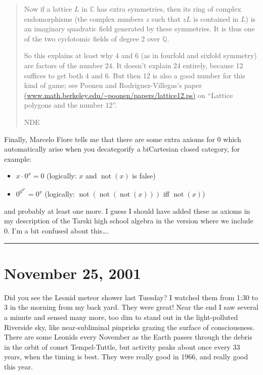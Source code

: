 \documentclass{article}
\def\tightlist{}
\begin{document}
\begin{quote}
Now if a lattice \(L\) in \(\mathbb{C}\) has extra symmetries, then its
ring of complex endomorphisms (the complex numbers \(z\) such that
\(zL\) is contained in \(L\)) is an imaginary quadratic field generated
by these symmetries. It is thus one of the two cyclotomic fields of
degree 2 over \(\mathbb{Q}\).

So this explains at least why 4 and 6 (as in fourfold and sixfold
symmetry) are factors of the number 24. It doesn't explain 24 entirely,
because 12 suffices to get both 4 and 6. But then 12 is also a good
number for this kind of game; see Poonen and Rodriguez-Villegas's paper
\href{www.math.berkeley.edu/~poonen/papers/lattice12.ps}{(www.math.berkeley.edu/\textasciitilde poonen/papers/lattice12.ps)}
on ``Lattice polygons and the number 12''.

NDE
\end{quote}

Finally, Marcelo Fiore tells me that there are some extra axioms for
\(0\) which automatically arise when you decategorify a biCartesian
closed category, for example:

\begin{itemize}
\tightlist
\item
  \(x\cdot 0^x=0\) (logically: \(x\) and \(\operatorname{not}(x)\) is
  false)
\item
  \(0^{0^{0^x}}=0^x\) (logically:
  \(\operatorname{not}(\operatorname{not}(\operatorname{not}(x)))\) iff
  \(\operatorname{not}(x)\))
\end{itemize}

and probably at least one more. I guess I should have added these as
axioms in my description of the Tarski high school algebra in the
version where we include \(0\). I'm a bit confused about this\ldots.

\begin{center}\rule{0.5\linewidth}{0.5pt}\end{center}



\hypertarget{week173}{%
\section{November 25, 2001}\label{week173}}

Did you see the Leonid meteor shower last Tuesday? I watched them from
1:30 to 3 in the morning from my back yard. They were great! Near the
end I saw several a minute and sensed many more, too dim to stand out in
the light-polluted Riverside sky, like near-subliminal pinpricks grazing
the surface of consciousness. There are some Leonids every November as
the Earth passes through the debris in the orbit of comet Tempel-Tuttle,
but activity peaks about once every 33 years, when the timing is best.
They were really good in 1966, and really good this year.
\end{document}
